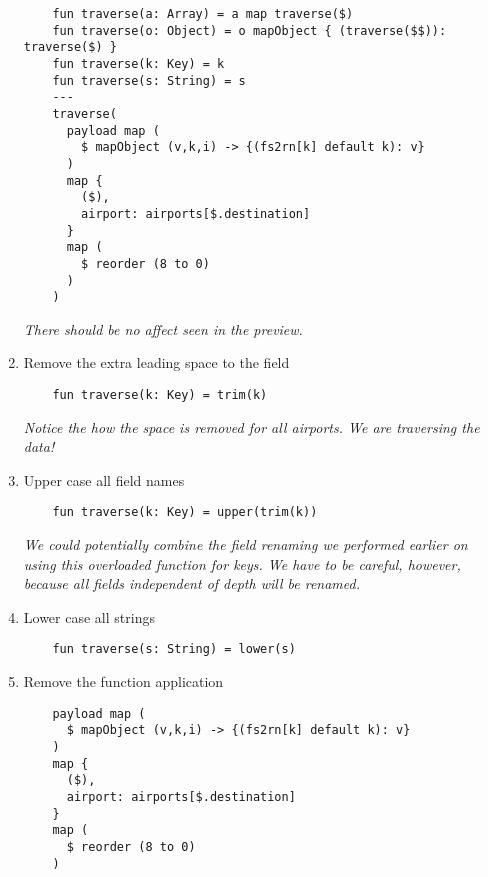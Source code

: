 \begin{enumerate}
  \begin{lstlisting}
    fun traverse(a: Array) = a map traverse($)
    fun traverse(o: Object) = o mapObject { (traverse($$)): traverse($) }
    fun traverse(k: Key) = k
    fun traverse(s: String) = s
    ---
    traverse(
      payload map (
        $ mapObject (v,k,i) -> {(fs2rn[k] default k): v}
      )
      map {
        ($),
        airport: airports[$.destination]
      }
      map (
        $ reorder (8 to 0)
      )
    )
  \end{lstlisting}
  \emph{
    There should be no affect seen in the preview.
  }
\item Remove the extra leading space to the  field
  \begin{lstlisting}
    fun traverse(k: Key) = trim(k)
  \end{lstlisting}
  \emph{
    Notice the how the space is removed for all airports.  We are traversing the data!
  }
\item Upper case all field names
  \begin{lstlisting}
    fun traverse(k: Key) = upper(trim(k))
  \end{lstlisting}
  \emph{
    We could potentially combine the field renaming we performed earlier on using this overloaded  function for keys.  We have to be careful, however, because all fields independent of depth will be renamed.
  }
\item Lower case all strings
  \begin{lstlisting}
    fun traverse(s: String) = lower(s)
  \end{lstlisting}
\item Remove the  function application
  \begin{lstlisting}
    payload map (
      $ mapObject (v,k,i) -> {(fs2rn[k] default k): v}
    )
    map {
      ($),
      airport: airports[$.destination]
    }
    map (
      $ reorder (8 to 0)
    )
  \end{lstlisting}
\end{enumerate}

